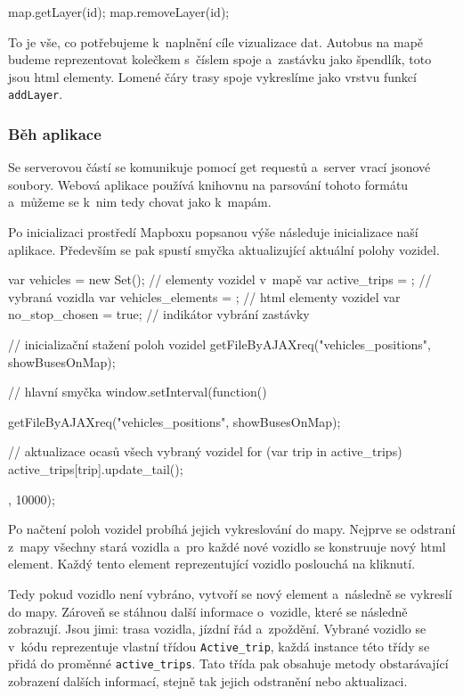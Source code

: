 \begin{code}[frame=none]
map.getLayer(id);
map.removeLayer(id);
\end{code}


To je vše, co potřebujeme k~naplnění cíle vizualizace dat. Autobus na mapě budeme reprezentovat kolečkem s~číslem spoje a~zastávku jako špendlík, toto jsou \gls{html} elementy. Lomené čáry trasy spoje vykreslíme jako vrstvu funkcí \verb-addLayer-.


\subsubsection{Běh aplikace}


Se serverovou částí se komunikuje pomocí get requestů a~server vrací \gls{json}ové soubory. Webová aplikace používá knihovnu na parsování tohoto formátu a~můžeme se k~nim tedy chovat jako k~mapám.


\bigbreak

Po inicializaci prostředí Mapboxu popsanou výše následuje inicializace naší aplikace. Především se pak spustí smyčka aktualizující aktuální polohy vozidel.


\begin{code}[frame=none]
var vehicles = new Set(); // elementy vozidel v~mapě
var active_trips = {}; // vybraná vozidla
var vehicles_elements = {}; // html elementy vozidel
var no_stop_chosen = true; // indikátor vybrání zastávky


// inicializační stažení poloh vozidel
getFileByAJAXreq("vehicles_positions", showBusesOnMap);


// hlavní smyčka
window.setInterval(function(){
getFileByAJAXreq("vehicles_positions", showBusesOnMap);


// aktualizace ocasů všech vybraný vozidel
for (var trip in active_trips){
  active_trips[trip].update_tail();
}
}, 10000);
\end{code}


Po načtení poloh vozidel probíhá jejich vykreslování do mapy. Nejprve se odstraní z~mapy všechny stará vozidla a~pro každé nové vozidlo se konstruuje nový \gls{html} element. Každý tento element reprezentující vozidlo poslouchá na kliknutí.


\bigbreak


Tedy pokud vozidlo není vybráno, vytvoří se nový element a~následně se vykreslí do mapy. Zároveň se stáhnou další informace o~vozidle, které se následně zobrazují. Jsou jimi: trasa vozidla, jízdní řád a~zpoždění. Vybrané vozidlo se v~kódu reprezentuje vlastní třídou \verb-Active_trip-, každá instance této třídy se přidá do proměnné \verb-active_trips-. Tato třída pak obsahuje metody obstarávající zobrazení dalších informací, stejně tak jejich odstranění nebo aktualizaci.


